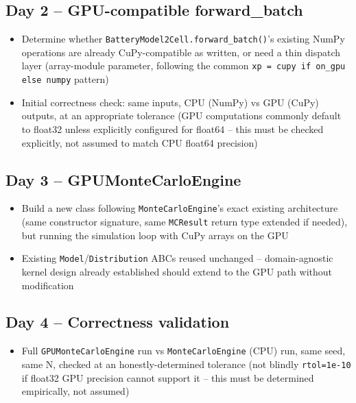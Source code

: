 \documentclass[11pt]{article}
\begin{document}
\subsection*{Day 2 -- GPU-compatible forward\_batch}
\begin{itemize}[leftmargin=*]
  \item Determine whether \texttt{BatteryModel2Cell.forward\_batch()}'s
    existing NumPy operations are already CuPy-compatible as written,
    or need a thin dispatch layer (array-module parameter, following
    the common \texttt{xp = cupy if on\_gpu else numpy} pattern)
  \item Initial correctness check: same inputs, CPU (NumPy) vs GPU
    (CuPy) outputs, at an appropriate tolerance (GPU computations
    commonly default to float32 unless explicitly configured for
    float64 -- this must be checked explicitly, not assumed to match
    CPU float64 precision)
\end{itemize}

\subsection*{Day 3 -- GPUMonteCarloEngine}
\begin{itemize}[leftmargin=*]
  \item Build a new class following \texttt{MonteCarloEngine}'s exact
    existing architecture (same constructor signature, same
    \texttt{MCResult} return type extended if needed), but running the
    simulation loop with CuPy arrays on the GPU
  \item Existing \texttt{Model}/\texttt{Distribution} ABCs reused
    unchanged -- domain-agnostic kernel design already established
    should extend to the GPU path without modification
\end{itemize}

\subsection*{Day 4 -- Correctness validation}
\begin{itemize}[leftmargin=*]
  \item Full \texttt{GPUMonteCarloEngine} run vs
    \texttt{MonteCarloEngine} (CPU) run, same seed, same N, checked at
    an honestly-determined tolerance (not blindly \texttt{rtol=1e-10}
    if float32 GPU precision cannot support it -- this must be
    determined empirically, not assumed)
\end{itemize}
\end{document}
